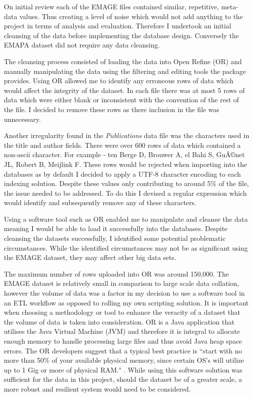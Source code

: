 On initial review each of the EMAGE files contained similar, repetitive, meta-data values. Thus creating a level of noise which would not add anything to the project in terms of analysis and evaluation. Therefore I undertook an initial cleansing of the data before implementing the database design. Conversely the EMAPA dataset did not require any data cleansing.

The cleansing process consisted of loading the data into Open Refine (OR) and manually manipulating the data using the filtering and editing tools the package provides. Using OR allowed me to identify any erroneous rows of data which would affect the integrity of the dataset. In each file there was at most 5 rows of data which were either blank or inconsistent with the convention of the rest of the file. I decided to remove these rows as there inclusion in the file was unnecessary.

Another irregularity found in the \textit{Publications} data file was the characters used in the title and author fields. There were over 600 rows of data which contained a non-ascii character. For example - ten Berge D, Brouwer A, el Bahi S, GuÃ©net JL, Robert B, Meijlink F. These rows would be rejected when importing into the databases as by default I decided to apply a UTF-8 character encoding to each indexing solution. Despite these values only contributing to around 5\% of the file, the issue needed to be addressed. To do this I devised a regular expression which would identify and subsequently remove any of these characters.

Using a software tool such as OR enabled me to manipulate and cleanse the data meaning I would be able to load it successfully into the databases. Despite cleansing the datasets successfully, I identified some potential problematic circumstances. While the identified circumstances may not be as significant using the EMAGE dataset, they may affect other big data sets.

The maximum number of rows uploaded into OR was around 150,000. The EMAGE dataset is relatively small in comparison to large scale data collation, however the volume of data was a factor in my decision to use a software tool in an ETL workflow as opposed to rolling my own scripting solution. It is important when choosing a methodology or tool to enhance the veracity of a dataset that the volume of data is taken into consideration. OR is a Java application that utilises the Java Virtual Machine (JVM) and therefore it is integral to allocate enough memory to handle processing large files and thus avoid Java heap space errors. The OR developers suggest that a typical best practice is ``start with no more than 50\% of your available physical memory, since certain OS's will utilize up to 1 Gig or more of physical RAM." \cite{googref}. While using this software solution was sufficient for the data in this project, should the dataset be of a greater scale, a more robust and resilient system would need to be considered.

